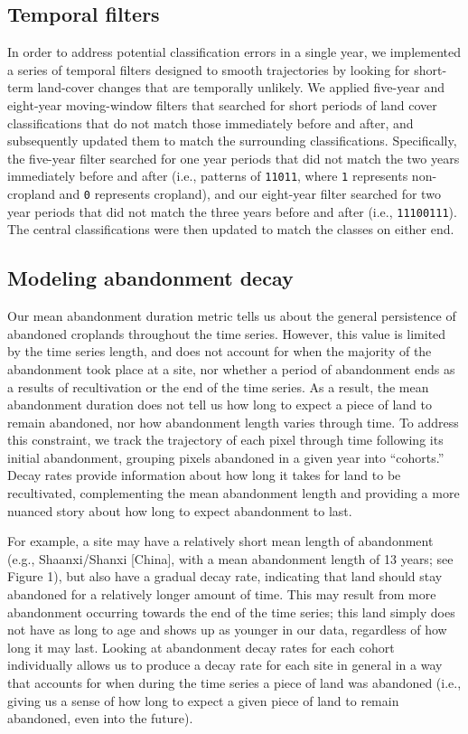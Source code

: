 \documentclass[
]{article}
\begin{document}
\hypertarget{temporal-filters}{%
\subsection{Temporal filters}\label{temporal-filters}}

In order to address potential classification errors in a single year, we implemented a series of temporal filters designed to smooth trajectories by looking for short-term land-cover changes that are temporally unlikely.
We applied five-year and eight-year moving-window filters that searched for short periods of land cover classifications that do not match those immediately before and after, and subsequently updated them to match the surrounding classifications.
Specifically, the five-year filter searched for one year periods that did not match the two years immediately before and after (i.e., patterns of \texttt{11011}, where \texttt{1} represents non-cropland and \texttt{0} represents cropland), and our eight-year filter searched for two year periods that did not match the three years before and after (i.e., \texttt{11100111}).
The central classifications were then updated to match the classes on either end.

\hypertarget{decay-models-si}{%
\subsection{Modeling abandonment decay}\label{decay-models-si}}

Our mean abandonment duration metric tells us about the general persistence of abandoned croplands throughout the time series.
However, this value is limited by the time series length, and does not account for when the majority of the abandonment took place at a site, nor whether a period of abandonment ends as a results of recultivation or the end of the time series.
As a result, the mean abandonment duration does not tell us how long to expect a piece of land to remain abandoned, nor how abandonment length varies through time.
To address this constraint, we track the trajectory of each pixel through time following its initial abandonment, grouping pixels abandoned in a given year into ``cohorts.''
Decay rates provide information about how long it takes for land to be recultivated, complementing the mean abandonment length and providing a more nuanced story about how long to expect abandonment to last.

For example, a site may have a relatively short mean length of abandonment (e.g., Shaanxi/Shanxi {[}China{]}, with a mean abandonment length of 13 years; see Figure 1), but also have a gradual decay rate, indicating that land should stay abandoned for a relatively longer amount of time.
This may result from more abandonment occurring towards the end of the time series; this land simply does not have as long to age and shows up as younger in our data, regardless of how long it may last.
Looking at abandonment decay rates for each cohort individually allows us to produce a decay rate for each site in general in a way that accounts for when during the time series a piece of land was abandoned (i.e., giving us a sense of how long to expect a given piece of land to remain abandoned, even into the future).
\end{document}
